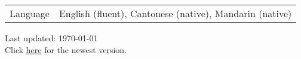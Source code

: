 \documentclass[letterpaper, 11pt]{article}
\begin{document}
\noindent \begin{tabular}{@{} p{3cm} l}
	\Large{Language}  & English (fluent), Cantonese (native), Mandarin (native)   \\
\end{tabular}





\vspace{1cm}

\begin{center}
  \begin{footnotesize}
    Last updated: \today \\
    Click \href{https://jiachenghe.github.io/files/cv/CV.pdf}{\underline{here}} for the newest version.
  \end{footnotesize}
\end{center}
\end{document}

